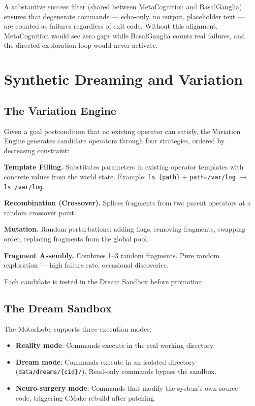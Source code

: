 \documentclass[12pt,a4paper]{report}
\begin{document}
A substantive success filter (shared between MetaCognition and BasalGanglia) ensures that degenerate commands --- echo-only, no output, placeholder text --- are counted as failures regardless of exit code. Without this alignment, MetaCognition would see zero gaps while BasalGanglia counts real failures, and the directed exploration loop would never activate.

\chapter{Synthetic Dreaming and Variation}

\section{The Variation Engine}
Given a goal postcondition that no existing operator can satisfy, the Variation Engine generates candidate operators through four strategies, ordered by decreasing constraint:

\textbf{Template Filling.} Substitutes parameters in existing operator templates with concrete values from the world state. Example: \texttt{ls \{path\}} + \texttt{path=/var/log} $\to$ \texttt{ls /var/log}.

\textbf{Recombination (Crossover).} Splices fragments from two parent operators at a random crossover point.

\textbf{Mutation.} Random perturbations: adding flags, removing fragments, swapping order, replacing fragments from the global pool.

\textbf{Fragment Assembly.} Combines 1--3 random fragments. Pure random exploration --- high failure rate, occasional discoveries.

Each candidate is tested in the Dream Sandbox before promotion.

\section{The Dream Sandbox}
The MotorLobe supports three execution modes:

\begin{itemize}
    \item \textbf{Reality mode}: Commands execute in the real working directory.
    \item \textbf{Dream mode}: Commands execute in an isolated directory (\texttt{data/dreams/\{cid\}/}). Read-only commands bypass the sandbox.
    \item \textbf{Neuro-surgery mode}: Commands that modify the system's own source code, triggering CMake rebuild after patching.
\end{itemize}
\end{document}
